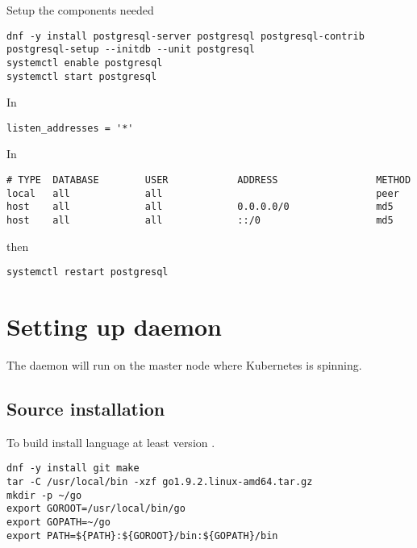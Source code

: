 Setup the components needed

\begin{lstlisting}
dnf -y install postgresql-server postgresql postgresql-contrib
postgresql-setup --initdb --unit postgresql
systemctl enable postgresql
systemctl start postgresql
\end{lstlisting}

In 

\begin{lstlisting}
listen_addresses = '*'
\end{lstlisting}

In 

\begin{lstlisting}
# TYPE  DATABASE        USER            ADDRESS                 METHOD
local   all             all                                     peer
host    all             all             0.0.0.0/0               md5
host    all             all             ::/0                    md5
\end{lstlisting}

then

\begin{lstlisting}
systemctl restart postgresql
\end{lstlisting}

\section{Setting up  daemon}
\label{sec:setup-swifty}

The  daemon will run on the master node
where Kubernetes is spinning.

\subsection{Source installation}
\label{subsec:setup-swifty-src}

To build  install 
language at least version
.

\begin{lstlisting}
dnf -y install git make
tar -C /usr/local/bin -xzf go1.9.2.linux-amd64.tar.gz
mkdir -p ~/go
export GOROOT=/usr/local/bin/go
export GOPATH=~/go
export PATH=${PATH}:${GOROOT}/bin:${GOPATH}/bin
\end{lstlisting}

